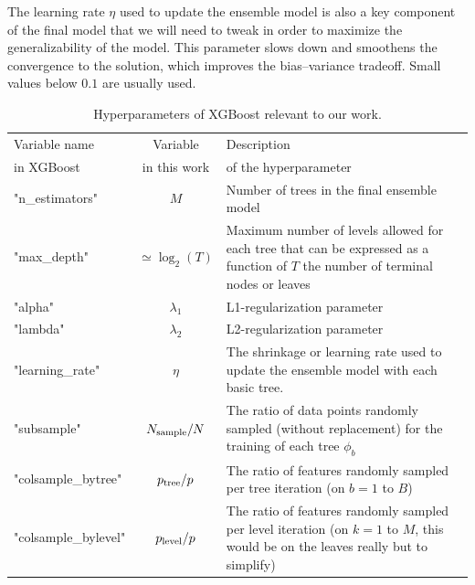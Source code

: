 \documentclass[main]{subfiles}
\begin{document}
The learning rate $\eta$ used to update the ensemble model is also a key component of the final model that we will need to tweak in order to maximize the generalizability of the model. This parameter slows down and smoothens the convergence to the solution, which improves the bias--variance tradeoff. Small values below $0.1$ are usually used.

\begin{table}[ht]
  \setlength{\extrarowheight}{1pt}
  \centering
  \begin{tabular}{|l|c|m{8cm}|}
  \hline
    Variable name  &  Variable   &   Description\\
    in XGBoost  &    in this work &  of the hyperparameter \\
  \hline
      "n\_estimators" &   $M$ &   Number of trees in the final ensemble model  \\
      "max\_depth" &      $\simeq\log_2(T)$ &   Maximum number of levels allowed for each tree that can be expressed as a function of $T$ the number of terminal nodes or leaves \\
      "alpha" &   $\lambda_1$ &   L1-regularization parameter  \\
      "lambda" &   $\lambda_2$ &  L2-regularization parameter  \\
      "learning\_rate" &   $\eta$ &   The shrinkage or learning rate used to update the ensemble model with each basic tree.  \\
      "subsample" &   $N_{\text{sample}}/N$ &   The ratio of data points randomly sampled (without replacement) for the training of each tree $\phi_b$  \\
      "colsample\_bytree" &   $p_{\text{tree}}/p$  &   The ratio of features randomly sampled per tree iteration (on $b=1$ to $B$)  \\
      "colsample\_bylevel" &   $p_{\text{level}}/p$  &   The ratio of features randomly sampled per level iteration (on $k=1$ to $M$, this would be on the leaves really but to simplify) \\
  \hline
  \end{tabular}
  \caption{Hyperparameters of XGBoost relevant to our work.}\label{tab:hyperparameter}
\end{table}
\end{document}
